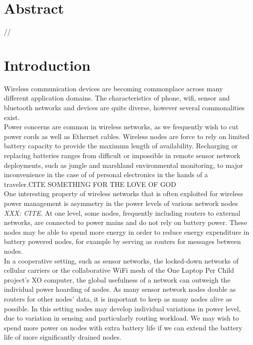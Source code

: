 
\section{Abstract}
{\it

//}

\section{Introduction}
Wireless communication devices are becoming commonplace across many
different application domains.  The characteristics of phone, wifi,
sensor and bluetooth networks and devices are quite diverse, however
several commonalities exist.\\  

Power concerns are common in wireless networks, as we frequently wish
to cut power cords as well as Ethernet cables.  Wireless nodes are
force to rely on limited battery capacity to provide the maximum
length of availability.  Recharging or replacing batteries ranges from
difficult or impossible in remote sensor network deployments, such as
jungle and marshland environmental monitoring, to major inconvenience in
the case of of personal electronics in the hands of a traveler.{CITE
  SOMETHING FOR THE LOVE OF GOD}\\

One interesting property of wireless networks that is often exploited
for wireless power management is asymmetry in the power levels of
various network nodes {\em XXX: CITE}.  At one level, some nodes,
frequently including routers to external networks, are connected to
power mains and do not rely on battery power.  These nodes may be able
to spend more energy in order to reduce energy expenditure in battery
powered nodes, for example by serving as routers for messages between
nodes.\\

In a cooperative setting, such as sensor networks, the locked-down
networks of cellular carriers or the collaborative WiFi mesh of the One
Laptop Per Child project's XO computer, the global usefulness of a
network can outweigh the individual power hoarding of nodes.  As many
sensor network nodes double as routers for other nodes' data, it is
important to keep as many nodes alive as possible.  In this setting
nodes may develop individual variations in power level, due to variation
in sensing and particularly routing workload.  We may wish to spend
more power on nodes with extra battery life if we can extend the
battery life of more significantly drained nodes.\\

